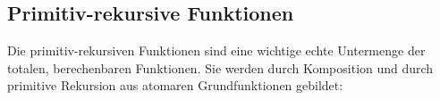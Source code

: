 \documentclass{scrartcl}
\begin{document}
\begin{enumerate*}
\begin{remark}
\begin{remark}
%
%
%
%
%
%
%
%


\subsection{Primitiv-rekursive Funktionen}

Die primitiv-rekursiven Funktionen sind eine wichtige echte Untermenge der 
totalen, berechenbaren Funktionen. Sie werden durch Komposition und
durch primitive Rekursion aus atomaren Grundfunktionen gebildet:


\end{remark}
\end{remark}
\end{enumerate*}
\end{document}
